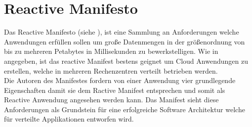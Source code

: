 \section{Reactive Manifesto}
Das {Reactive Manifesto} (siehe \cite{reactiveManifesto}), ist eine Sammlung an Anforderungen welche Anwendungen erfüllen sollen um große Datenmengen in der größenordnung von bis zu mehreren Petabytes in Millisekunden zu bewerkstelligen. 
Wie in \cite{reactiveManifesto} angegeben, ist das {reactive Manifest} bestens geignet um Cloud Anwendungen zu erstellen, welche in mehreren Rechenzentren verteilt betrieben werden. \\
Die Autoren des Manifestes fordern von einer Anwendung vier grundlegende Eigenschaften damit sie dem {Ractive Manifest} entsprechen und somit als {Reactive Anwendung} angesehen werden kann. Das Manifest sieht diese Anforderungen als Grundstein für eine erfolgreiche Software Architektur welche für verteilte Applikationen entworfen wird. 
